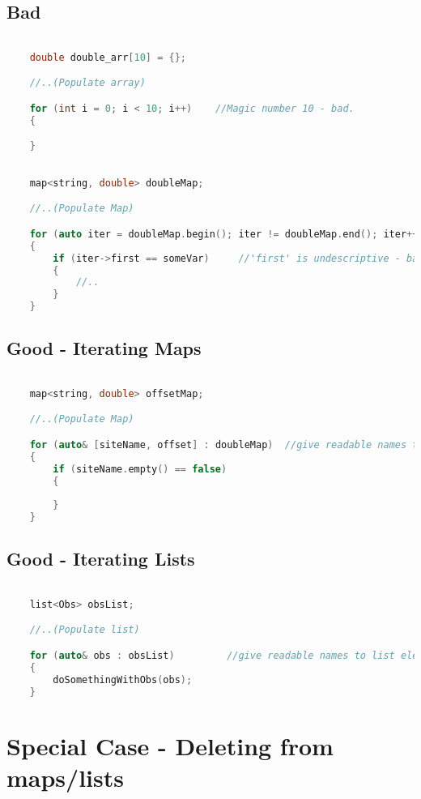 \subsection{Bad}
\begin{lstlisting}[language=c++]

    double double_arr[10] = {};

    //..(Populate array)

    for (int i = 0; i < 10; i++)    //Magic number 10 - bad.
    {

    }
\end{lstlisting}
%
\begin{lstlisting}[language=c++]

    map<string, double> doubleMap;

    //..(Populate Map)

    for (auto iter = doubleMap.begin(); iter != doubleMap.end(); iter++)   //long, undescriptive - bad
    {
    	if (iter->first == someVar)     //'first' is undescriptive - bad
    	{
    		//..
    	}
    }
\end{lstlisting}
\subsection{Good - Iterating Maps}
\begin{lstlisting}[language=c++]

    map<string, double> offsetMap;

    //..(Populate Map)

    for (auto& [siteName, offset] : doubleMap)	//give readable names to map keys and values
    {
        if (siteName.empty() == false)
        {
        
        }
    }
\end{lstlisting}
\subsection{ Good - Iterating Lists}
\begin{lstlisting}[language=c++]

    list<Obs> obsList;

    //..(Populate list)

    for (auto& obs : obsList)         //give readable names to list elements
    {
        doSomethingWithObs(obs);
    }
\end{lstlisting}

\section{Special Case - Deleting from maps/lists}

